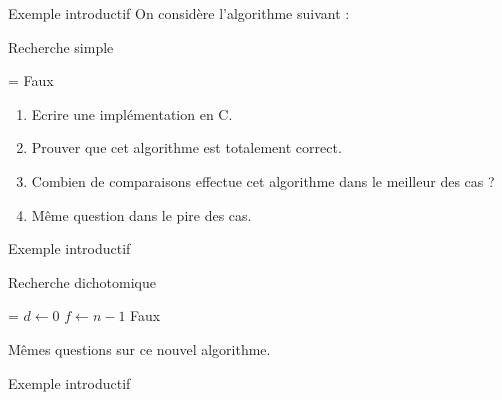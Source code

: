 \documentclass[10pt]{beamer}
\begin{document}
\begin{frame}[fragile]{\Ctitle}{\stitle}
    \begin{exampleblock}{Exemple introductif}
        On considère l'algorithme suivant :
        \SetAlFnt{\small}
	\setlength{\algomargin}{8pt}
	\begin{algorithm}[H]
		\DontPrintSemicolon
		\caption{Recherche simple}
		\everypar={\footnotesize \textcolor{gray}{\nl}}
		\Return Faux
	  \end{algorithm} 
      \begin{enumerate}
        \item<2-> Ecrire une implémentation en C.
        \item<3-> Prouver que cet algorithme est totalement correct.
        \item<3-> Combien de comparaisons effectue cet algorithme dans le meilleur des cas ?
        \item<4-> Même question dans le pire des cas.
    \end{enumerate}
    \end{exampleblock}
\end{frame}


\begin{frame}[fragile]{\Ctitle}{\stitle}
    \begin{exampleblock}{Exemple introductif}
        \SetAlFnt{\small}
	\setlength{\algomargin}{8pt}
	\begin{algorithm}[H]
        \footnotesize
		\DontPrintSemicolon
		\caption{Recherche dichotomique}
		\everypar={\footnotesize \textcolor{gray}{\nl}}
        $ d \leftarrow 0$ \;
        $ f \leftarrow n-1$ \;
		\Return Faux
	  \end{algorithm} 
      Mêmes questions sur ce nouvel algorithme.
    \end{exampleblock}
\end{frame}

\begin{frame}[fragile]{\Ctitle}{\stitle}
    \begin{exampleblock}{Exemple introductif}
    \end{exampleblock}
\end{frame}
\end{document}
